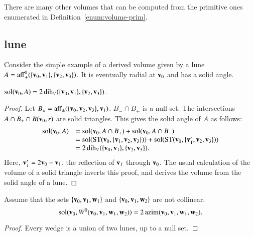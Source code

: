 There are many other volumes that can be computed from the
primitive ones enumerated in Definition~\ref{enum:volume-prim}.

\subsection{lune}  
%

Consider the simple example of a derived volume given by a
lune $A={\operatorname{aff}}_+^0(\{{\mathbf v}_0,{\mathbf v}_1\},\{{\mathbf v}_2,{\mathbf v}_3\})$.  It is eventually
radial at ${\mathbf v}_0$ and has a solid angle.
%

\begin{lemma}  $\operatorname{sol}({\mathbf v}_0,A) = 2\operatorname{dih}_V(\{{\mathbf v}_0,{\mathbf v}_1\},\{{\mathbf v}_2,{\mathbf v}_3\})$.
\end{lemma}

\begin{proof}
Let $B_{\pm} = {\operatorname{aff}}_\pm(\{{\mathbf v}_0,{\mathbf v}_2,{\mathbf v}_3\},{\mathbf v}_1)$.  $B_- \cap B_+$
is a null set.  The intersections $A\cap B_{\pm}\cap B({\mathbf v}_0,r)$ 
are solid triangles.  This gives the solid angle of $A$ as
follows:
   \begin{displaymath}\begin{array}{lll}
   \operatorname{sol}({\mathbf v}_0,A) &= \operatorname{sol}({\mathbf v}_0,A\cap B_+)+\operatorname{sol}({\mathbf v}_0,A\cap B_-) \\
   &= 
   \operatorname{sol}({\operatorname{ST}}({\mathbf v}_0,\{{\mathbf v}_1,{\mathbf v}_2,{\mathbf v}_3\})) + \operatorname{sol}({\operatorname{ST}}({\mathbf v}_0,\{{\mathbf v}_1',{\mathbf v}_2,{\mathbf v}_3\})) \\
   &=
   2\operatorname{dih}_V(\{{\mathbf v}_0,{\mathbf v}_1\},\{{\mathbf v}_2,{\mathbf v}_3\}).
   \end{array}
   \end{displaymath}
Here,  ${\mathbf v}_1'= 2 {\mathbf v}_0 - {\mathbf v}_1$, the reflection of ${\mathbf v}_1$
through ${\mathbf v}_0$.  The usual calculation of the volume of a solid triangle
inverts this proof, 
and derives the volume from the solid angle of a lune.
\end{proof}



\begin{lemma} 
Assume that the sets $\{{\mathbf v}_0,{\mathbf v}_1,{\mathbf w}_1\}$ and
$\{{\mathbf v}_0,{\mathbf v}_1,{\mathbf w}_2\}$ are not collinear. 
\begin{displaymath}\operatorname{sol}({\mathbf v}_0,W^0({\mathbf v}_0,{\mathbf v}_1,{\mathbf w}_1,{\mathbf w}_2)) = 2\,{\operatorname{azim}}({\mathbf v}_0,{\mathbf v}_1,{\mathbf w}_1,{\mathbf w}_2).\end{displaymath}
%
\end{lemma}    

\begin{proof} Every wedge is a union of two lunes, up to a null set.
\end{proof}

